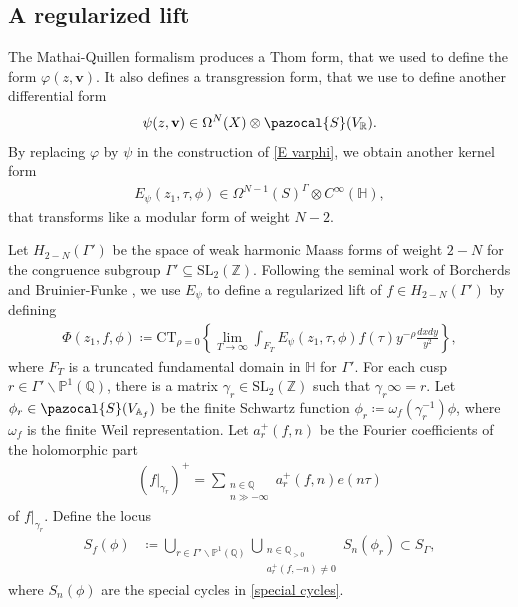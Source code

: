 \documentclass[twoside,a4paper,10pt]{article} %
\newcommand{\dxdy}{\frac{dxdy}{y^2}}
\newcommand{\8}{\infty}
\newcommand{\Z}{\mathbb{Z}}
\newcommand{\vbf}{\mathbf{v}}
\newcommand{\SL}{\mathrm{SL}}
\newcommand{\HH}{\mathbb{H}}
\newcommand{\R}{\mathbb{R}}
\newcommand{\A}{\mathbb{A}}
\newcommand{\Q}{\mathbb{Q}}
\newcommand{\PP}{\mathbb{P}}
\newcommand{\CT}{\mathrm{CT}_{\rho=0}}
\newcommand{\Scal}{\pazocal{S}}
\theoremstyle{mytheoremstyle}
\theoremstyle{remark}
\numberwithin{equation}{section}
\begin{document}
\subsection{A regularized lift} 


The Mathai-Quillen formalism produces a Thom form, that we used to define the form $\varphi(z,\vbf)$. It also defines a transgression form, that we use to define another differential form 
\begin{align}
\psi(z,\vbf) \in \Omega^{N}(X) \otimes \Scal(V_\R).
\end{align}
By replacing $\varphi$ by $\psi$ in the construction  of \eqref{E varphi}, we obtain another kernel form
\begin{align}
E_\psi(z_1,\tau,\phi) \in \Omega^{N-1}(S)^\Gamma \otimes C^\8(\HH),
\end{align}
that transforms like a modular form of weight $N-2$.

Let $H_{2-N}(\Gamma')$ be the space of weak harmonic Maass forms of weight $2-N$ for the congruence subgroup $\Gamma' \subseteq \SL_2(\Z)$. Following the seminal work of Borcherds \cite{borcherds1,borcherds2} and Bruinier-Funke \cite{BF04}, we use $E_\psi$ to define a regularized lift of $f \in H_{2-N}(\Gamma')$ by defining
\begin{align} \label{expression one}
\Phi(z_1,f,\phi) \coloneqq \CT \left \{ \lim_{T\rightarrow \8} \int_{F_T} E_{\psi}(z_1,\tau,\phi)f(\tau) y^{-\rho} \dxdy \right \},
\end{align}
where $F_T$ is a truncated fundamental domain in $\HH$ for $\Gamma'$. For each cusp $r \in \Gamma' \backslash \PP^1(\Q)$, there is a matrix $\gamma_r \in \SL_2(\Z)$ such that $\gamma_r \8=r$. Let $\phi_r \in \Scal(V_{\A_f})$ be the finite Schwartz function $\phi_r \coloneqq \omega_f(\gamma_r^{-1}) \phi$, where $\omega_f$ is the finite Weil representation. Let $a^+_r(f,n)$ be the Fourier coefficients of the holomorphic part 
\begin{align}
(f \vert_{\gamma_r})^+= \sum_{\substack{n \in \Q \\ n \gg -\8}} a^+_r(f,n)e(n\tau)
\end{align}
of $f \vert_{\gamma_r}$. Define the locus
\begin{align} 
S_f(\phi)& \coloneqq \bigcup_{r \in \Gamma' \backslash \PP^1(\Q)} \bigcup_{\substack{ n \in \Q_{>0} \\ a^+_r(f,-n) \neq 0}} S_n(\phi_r) \subset S_\Gamma,
\end{align}
where $S_n(\phi)$ are the special cycles in \eqref{special cycles}.
\end{document}
